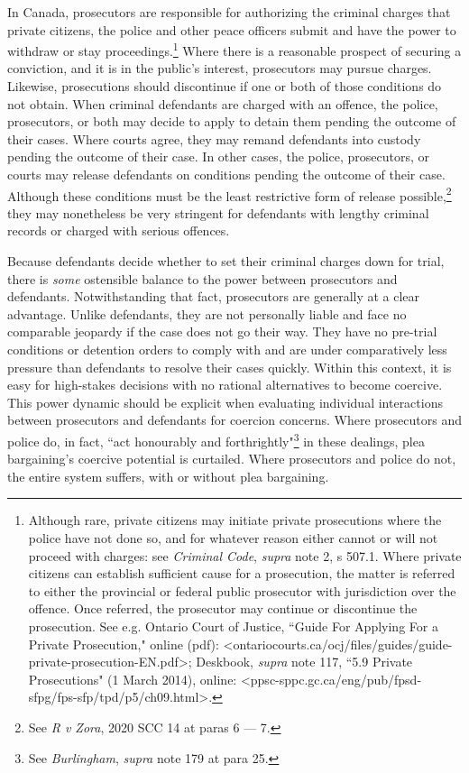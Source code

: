 In Canada, prosecutors are responsible for authorizing the criminal charges that private citizens, the police and other peace officers submit and have the power to withdraw or stay proceedings.\footnote{Although rare, private citizens may initiate private prosecutions where the police have not done so, and for whatever reason either cannot or will not proceed with charges: see \textit{Criminal Code}, \textit{supra} note 2, s 507.1. Where private citizens can establish sufficient cause for a prosecution, the matter is referred to either the provincial or federal public prosecutor with jurisdiction over the offence. Once referred, the prosecutor may continue or discontinue the prosecution. See e.g. Ontario Court of Justice, ``Guide For Applying For a Private Prosecution," online (pdf): \textless ontariocourts.ca/ocj/files/guides/guide-private-prosecution-EN.pdf\textgreater; Deskbook, \textit{supra} note 117, ``5.9 Private Prosecutions" (1 March 2014), online: \textless ppsc-sppc.gc.ca/eng/pub/fpsd-sfpg/fps-sfp/tpd/p5/ch09.html\textgreater.} Where there is a reasonable prospect of securing a conviction, and it is in the public's interest, prosecutors may pursue charges. Likewise, prosecutions should discontinue if one or both of those conditions do not obtain. When criminal defendants are charged with an offence, the police, prosecutors, or both may decide to apply to detain them pending the outcome of their cases. Where courts agree, they may remand defendants into custody pending the outcome of their case. In other cases, the police, prosecutors, or courts may release defendants on conditions pending the outcome of their case. Although these conditions must be the least restrictive form of release possible,\footnote{See \textit{R v Zora}, 2020 SCC 14 at paras 6 — 7.} they may nonetheless be very stringent for defendants with lengthy criminal records or charged with serious offences.

Because defendants decide whether to set their criminal charges down for trial, there is \textit{some} ostensible balance to the power between prosecutors and defendants. Notwithstanding that fact, prosecutors are generally at a clear advantage. Unlike defendants, they are not personally liable and face no comparable jeopardy if the case does not go their way. They have no pre-trial conditions or detention orders to comply with and are under comparatively less pressure than defendants to resolve their cases quickly. Within this context, it is easy for high-stakes decisions with no rational alternatives to become coercive. This power dynamic should be explicit when evaluating individual interactions between prosecutors and defendants for coercion concerns. Where prosecutors and police do, in fact, ``act honourably and forthrightly"\footnote{See \textit{Burlingham}, \textit{supra} note 179 at para 25.} in these dealings, plea bargaining's coercive potential is curtailed. Where prosecutors and police do not, the entire system suffers, with or without plea bargaining.

